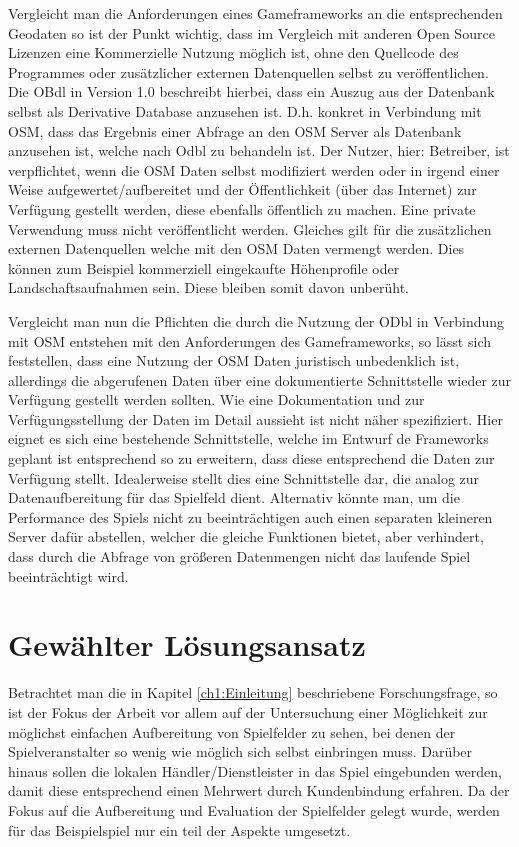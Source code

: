 Vergleicht man die Anforderungen eines Gameframeworks an die entsprechenden Geodaten so ist der Punkt wichtig, dass im Vergleich mit anderen Open Source Lizenzen eine Kommerzielle Nutzung möglich ist, ohne den Quellcode des Programmes oder zusätzlicher externen Datenquellen selbst zu veröffentlichen.
Die OBdl in Version 1.0 \cite{Odbl.2014} beschreibt hierbei, dass ein Auszug aus der Datenbank selbst als Derivative Database anzusehen ist. D.h. konkret in Verbindung mit OSM, dass das Ergebnis einer Abfrage an den OSM Server als Datenbank anzusehen ist, welche nach Odbl zu behandeln ist. Der Nutzer, hier: Betreiber, ist verpflichtet, wenn die OSM Daten selbst modifiziert werden oder in irgend einer Weise aufgewertet/aufbereitet und der Öffentlichkeit (über das Internet) zur Verfügung gestellt werden, diese ebenfalls öffentlich zu machen. Eine private Verwendung muss nicht veröffentlicht werden. Gleiches gilt für die zusätzlichen externen Datenquellen welche mit den OSM Daten vermengt werden. Dies können zum Beispiel kommerziell eingekaufte Höhenprofile oder Landschaftsaufnahmen sein. Diese bleiben somit davon unberüht.

Vergleicht man nun die Pflichten die durch die Nutzung der ODbl in Verbindung mit OSM entstehen mit den Anforderungen des Gameframeworks, so lässt sich feststellen, dass eine Nutzung der OSM Daten juristisch unbedenklich ist, allerdings die abgerufenen Daten über eine dokumentierte Schnittstelle wieder zur Verfügung gestellt werden sollten.
Wie eine Dokumentation und zur Verfügungsstellung der Daten im Detail aussieht ist nicht näher spezifiziert. Hier eignet es sich eine bestehende Schnittstelle, welche im Entwurf de Frameworks geplant ist entsprechend so zu erweitern, dass diese entsprechend die Daten zur Verfügung stellt. Idealerweise stellt dies eine Schnittstelle dar, die analog zur Datenaufbereitung für das Spielfeld dient. Alternativ könnte man, um die Performance des Spiels nicht zu beeinträchtigen auch einen separaten kleineren Server dafür abstellen, welcher die gleiche Funktionen bietet, aber verhindert, dass durch die Abfrage von größeren Datenmengen nicht das laufende Spiel beeinträchtigt wird.

\section{Gewählter Lösungsansatz}

Betrachtet man die in Kapitel \ref{ch1:Einleitung} beschriebene Forschungsfrage, so ist der Fokus der Arbeit vor allem auf der Untersuchung einer Möglichkeit zur möglichst einfachen Aufbereitung von Spielfelder zu sehen, bei denen der Spielveranstalter so wenig wie möglich sich selbst einbringen muss. Darüber hinaus sollen die lokalen Händler/Dienstleister in das Spiel eingebunden werden, damit diese entsprechend einen Mehrwert durch Kundenbindung erfahren.
Da der Fokus auf die Aufbereitung und Evaluation der Spielfelder gelegt wurde, werden für das Beispielspiel nur ein teil der Aspekte umgesetzt.

